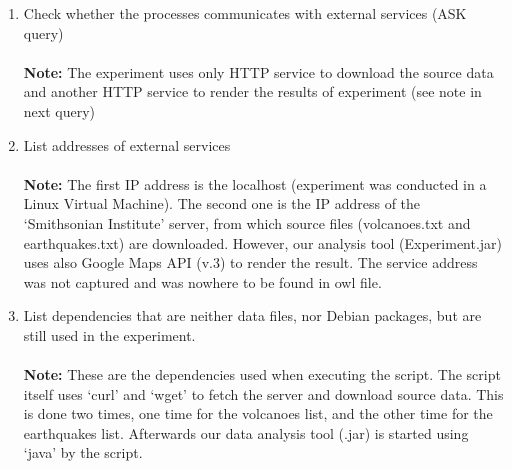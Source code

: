 \documentclass[12pt, a4paper]{article}
\begin{document}
\begin{enumerate}
\item Check whether the processes communicates with external services (ASK query)\\
\newline
\noindent{}\\
\newline
{\bf Note:} The experiment uses only HTTP service to download the source data and another HTTP service to render the results of experiment (see note in next query)

\item List addresses of external services\\
\newline
\noindent{}\\
\newline
{\bf Note:} The first IP address is the localhost (experiment was conducted in a Linux Virtual Machine). The second one is the IP address of the ‘Smithsonian Institute’ server, from which source files (volcanoes.txt and earthquakes.txt) are downloaded. However, our analysis tool (Experiment.jar) uses also Google Maps API (v.3) to render the result. The service address was not captured and was nowhere to be found in owl file.

\item List dependencies that are neither data files, nor Debian packages, but are still used in the experiment.\\
\newline
\noindent{}\\
\newline
{\bf Note:} These are the dependencies used when executing the script. The script itself uses ‘curl’ and ‘wget’ to fetch the server and download source data. This is done two times, one time for the volcanoes list, and the other time for the earthquakes list. Afterwards our data analysis tool (.jar) is started using ‘java’ by the script.

\end{enumerate}
\end{document}
